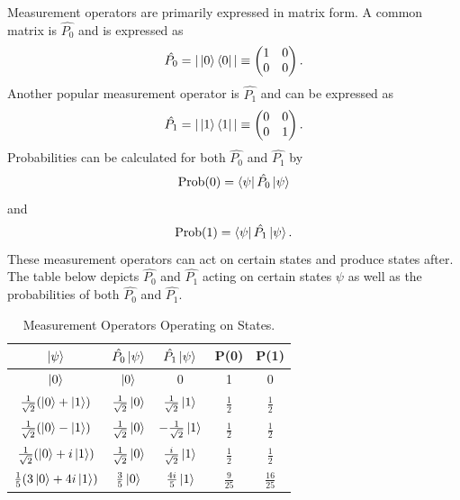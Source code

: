 \documentclass[twocolumn]{article}
\begin{document}
Measurement operators are primarily expressed in matrix form. A common matrix is $\hat{P_0}$ and is expressed as
\begin{equation}
\hat{P_0}=|\ket{0}\bra{0}|\equiv
\begin{pmatrix}
1 & 0 \\
0 & 0
\end{pmatrix}.
\end{equation}
Another popular measurement operator is $\hat{P_1}$ and can be expressed as
\begin{equation}
\hat{P_1}=|\ket{1}\bra{1}|\equiv
\begin{pmatrix}
0 & 0 \\
0 & 1
\end{pmatrix}.
\end{equation}
Probabilities can be calculated for both $\hat{P_0}$ and $\hat{P_1}$ by
\begin{equation}
\text{Prob(0)}=\bra{\psi}\hat{P_0}\ket{\psi}
\end{equation}
and
\begin{equation}
\text{Prob(1)}=\bra{\psi}\hat{P_1}\ket{\psi}.
\end{equation}
These measurement operators can act on certain states and produce states after. The table below depicts $\hat{P_0}$ and $\hat{P_1}$ acting on certain states $\psi$ as well as the probabilities of both $\hat{P_0}$ and $\hat{P_1}$.
\begin{table}[h!]
\begin{center}
\begin{tabular}{ |c|c|c|c|c| }
\hline $\ket{\psi}$& $\hat{P_0}\ket{\psi}$& $\hat{P_1}\ket{\psi}$& \small{P(0)}& \small{P(1)} \\ 
\hline $\ket{0}$& $\ket{0}$& 0& 1& 0 \\  
\hline $\frac{1}{\sqrt{2}}(\ket{0}+\ket{1})$& $\frac{1}{\sqrt{2}}\ket{0}$& $\frac{1}{\sqrt{2}}\ket{1}$& $\frac{1}{2}$& $\frac{1}{2}$\\
\hline $\frac{1}{\sqrt{2}}(\ket{0}-\ket{1})$& $\frac{1}{\sqrt{2}}\ket{0}$& $-\frac{1}{\sqrt{2}}\ket{1}$& $\frac{1}{2}$& $\frac{1}{2}$\\
\hline $\frac{1}{\sqrt{2}}(\ket{0}+i\ket{1})$& $\frac{1}{\sqrt{2}}\ket{0}$& $\frac{i}{\sqrt{2}}\ket{1}$& $\frac{1}{2}$& $\frac{1}{2}$\\
\hline $\frac{1}{5}(3\ket{0}+4i\ket{1})$& $\frac{3}{5}\ket{0}$& $\frac{4i}{5}\ket{1}$& $\frac{9}{25}$& $\frac{16}{25}$\\
\hline    
\end{tabular}
\caption{Measurement Operators Operating on States.}
\end{center}
\end{table}
\end{document}
